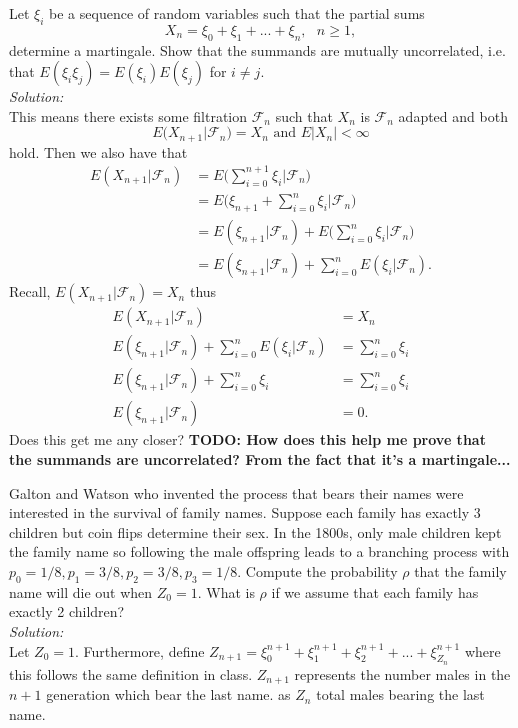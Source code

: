 \documentclass[10pt]{amsart}
\begin{document}
 Let $\xi_i$ be a sequence of random variables such that the partial sums 
$$X_n=\xi_0+\xi_1+...+\xi_n, \,\,\,\, n\geq 1,$$
determine a martingale. Show that the summands are mutually uncorrelated, i.e. that $E(\xi_i\xi_j)=E(\xi_i)E(\xi_j)$ for $i\neq j$. \\
\textit{Solution:} \\
This means there exists some filtration $\mathcal F_n$ such that $X_n$ is $\mathcal F_n$ adapted and both
$$E (X_{n + 1} | \mathcal F_n) = X_n \text{ and }E |X_n| < \infty$$
hold.
Then we also have that
\begin{align*}
E (X_{n + 1} | \mathcal F_n) &= E\bigg( \sum_{i=0}^{n+1} \xi_i \bigg| \mathcal F_n \bigg) \\
	&= E\bigg( \xi_{n + 1} + \sum_{i=0}^n \xi_i \bigg| \mathcal F_n \bigg) \\
	&= E ( \xi_{n + 1} | \mathcal F_n ) + E\bigg( \sum_{i=0}^n \xi_i \bigg| \mathcal F_n \bigg) \\
	&= E ( \xi_{n + 1} | \mathcal F_n ) + \sum_{i=0}^n E( \xi_i | \mathcal F_n).
\end{align*}
Recall, $E (X_{n + 1} | \mathcal F_n) = X_n$ thus
\begin{align*}
E (X_{n + 1} | \mathcal F_n) &= X_n \\
E ( \xi_{n + 1} | \mathcal F_n ) + \sum_{i=0}^n E( \xi_i | \mathcal F_n) &= \sum_{i=0}^n \xi_i \\
E ( \xi_{n + 1} | \mathcal F_n ) + \sum_{i=0}^n \xi_i &= \sum_{i=0}^n \xi_i \\
E ( \xi_{n + 1} | \mathcal F_n ) &= 0.
\end{align*}
Does this get me any closer?
\textbf{TODO: How does this help me prove that the summands are uncorrelated? From the fact that it's a martingale...}

\newpage

 Galton and Watson who invented the process that bears their names were interested in the survival of family names. Suppose each family has exactly 3 children but coin flips determine their sex. In the 1800s, only male children kept the family name so following the male offspring leads to a branching process with $p_0 = 1/8, p_1 = 3/8, p_2 = 3/8, p_3 = 1/8$. Compute the probability $\rho$ that the family name will die out when $Z_0 = 1$. What is $\rho$ if we assume that each family has exactly 2 children? \\

\noindent
\textit{Solution:} \\
Let $Z_0 = 1$.
Furthermore, define $Z_{n+1} = \xi_0^{n + 1} + \xi_1^{n + 1} + \xi_2^{n + 1} + ... + \xi_{Z_n}^{n + 1}$ where this follows the same definition in class.
$Z_{n+1}$ represents the number males in the $n+1$ generation which bear the last name.
as $Z_n$ total males bearing the last name.
\end{document}
